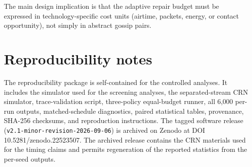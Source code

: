 \documentclass[11pt]{article}
\begin{document}
The main design implication is that the adaptive repair budget must be expressed in technology-specific cost units (airtime, packets, energy, or contact opportunity), not simply in abstract gossip pairs.


\section{Reproducibility notes}
The reproducibility package is self-contained for the controlled analyses. It includes the simulator used for the screening analyses, the separated-stream CRN simulator, trace-validation script, three-policy equal-budget runner, all 6,000 per-run outputs, matched-schedule diagnostics, paired statistical tables, provenance, SHA-256 checksums, and reproduction instructions. The tagged software release (\texttt{v2.1-minor-revision-2026-09-06}) is archived on Zenodo at DOI 10.5281/zenodo.22523507. The archived release contains the CRN materials used for the timing claims and permits regeneration of the reported statistics from the per-seed outputs.
\end{document}
